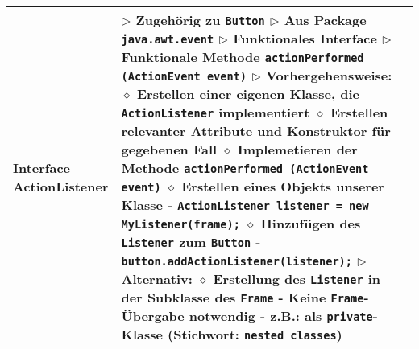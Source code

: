 \begin{longtable}{ | p{} p{} | }
	\makecell[l]{Interface \\ ActionListener} & \makecell[l]{
	$\rhd$ Zugehörig zu \texttt{Button} \\
	$\rhd$ Aus Package \texttt{java.awt.event} \\
	$\rhd$ Funktionales Interface \\
	$\rhd$ Funktionale Methode \texttt{actionPerformed (ActionEvent event)} \\
	$\rhd$ Vorhergehensweise: \\
	\hspace{0.4cm} $\diamond$ Erstellen einer eigenen Klasse, die \texttt{ActionListener} implementiert \\
	\hspace{0.4cm} $\diamond$ Erstellen relevanter Attribute und Konstruktor für gegebenen Fall \\
	\hspace{0.4cm} $\diamond$ Implemetieren der Methode \texttt{actionPerformed (ActionEvent event)} \\
	\hspace{0.4cm} $\diamond$ Erstellen eines Objekts unserer Klasse \\ 
	\hspace{0.6cm} - \texttt{ActionListener listener = new MyListener(frame);} \\
	\hspace{0.4cm} $\diamond$ Hinzufügen des \texttt{Listener} zum \texttt{Button} \\
	\hspace{0.6cm} - \texttt{button.addActionListener(listener);} \\
	$\rhd$ Alternativ: \\
	\hspace{0.4cm} $\diamond$ Erstellung des \texttt{Listener} in der Subklasse des \texttt{Frame} \\ 
	\hspace{0.6cm} - Keine \texttt{Frame}-Übergabe notwendig \\
	\hspace{0.6cm} - z.B.: als \texttt{private}-Klasse (Stichwort: \texttt{nested classes}) \\
	 } \\ \hline


\end{longtable}
